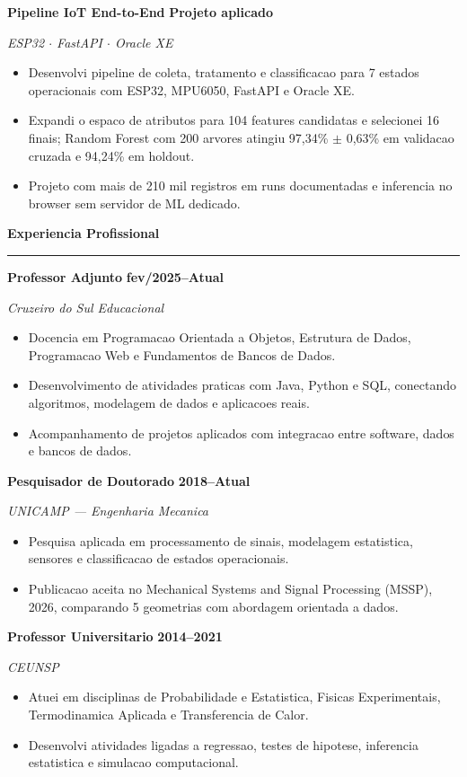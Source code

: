 \documentclass[10pt,a4paper]{article}
\newcommand{\cvsection}[1]{%
    \vspace{0.34em}
    {\large\bfseries\color{cvblue} #1}\par
    \vspace{0.05em}
    {\color{cvblue}\hrule}
    \vspace{0.15em}
}
\newcommand{\entry}[4]{%
    \textbf{#1} \hfill {\color{cvblue}\textbf{#2}}\par
    \textit{#3}\par
    #4
    \vspace{0.10em}
}
\begin{document}
\entry{Pipeline IoT End-to-End}{Projeto aplicado}{ESP32 $\cdot$ FastAPI $\cdot$ Oracle XE}{
\begin{itemize}
    \item Desenvolvi pipeline de coleta, tratamento e classificacao para 7 estados operacionais com ESP32, MPU6050, FastAPI e Oracle XE.
    \item Expandi o espaco de atributos para 104 features candidatas e selecionei 16 finais; Random Forest com 200 arvores atingiu 97,34\% $\pm$ 0,63\% em validacao cruzada e 94,24\% em holdout.
    \item Projeto com mais de 210 mil registros em runs documentadas e inferencia no browser sem servidor de ML dedicado.
\end{itemize}
}

\cvsection{Experiencia Profissional}

\entry{Professor Adjunto}{fev/2025--Atual}{Cruzeiro do Sul Educacional}{
\begin{itemize}
    \item Docencia em Programacao Orientada a Objetos, Estrutura de Dados, Programacao Web e Fundamentos de Bancos de Dados.
    \item Desenvolvimento de atividades praticas com Java, Python e SQL, conectando algoritmos, modelagem de dados e aplicacoes reais.
    \item Acompanhamento de projetos aplicados com integracao entre software, dados e bancos de dados.
\end{itemize}
}

\entry{Pesquisador de Doutorado}{2018--Atual}{UNICAMP --- Engenharia Mecanica}{
\begin{itemize}
    \item Pesquisa aplicada em processamento de sinais, modelagem estatistica, sensores e classificacao de estados operacionais.
    \item Publicacao aceita no Mechanical Systems and Signal Processing (MSSP), 2026, comparando 5 geometrias com abordagem orientada a dados.
\end{itemize}
}

\entry{Professor Universitario}{2014--2021}{CEUNSP}{
\begin{itemize}
    \item Atuei em disciplinas de Probabilidade e Estatistica, Fisicas Experimentais, Termodinamica Aplicada e Transferencia de Calor.
    \item Desenvolvi atividades ligadas a regressao, testes de hipotese, inferencia estatistica e simulacao computacional.
\end{itemize}
}
\end{document}
